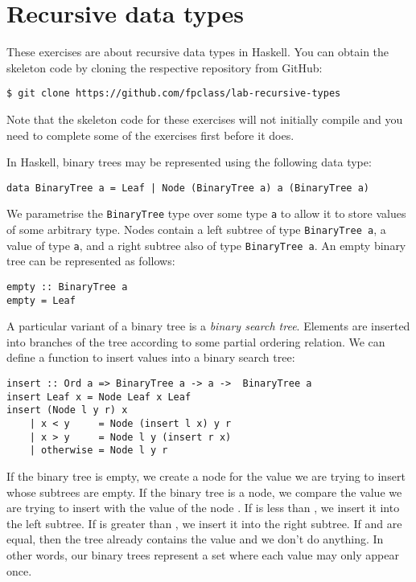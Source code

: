 \section{Recursive data types}

These exercises are about recursive data types in Haskell. You can obtain the skeleton code by cloning the respective repository from GitHub:
\begin{verbatim}
$ git clone https://github.com/fpclass/lab-recursive-types
\end{verbatim}
Note that the skeleton code for these exercises will not initially compile and you need to complete some of the exercises first before it does. 

\taskLine 

In Haskell, binary trees may be represented using the following data type:
\begin{verbatim}
data BinaryTree a = Leaf | Node (BinaryTree a) a (BinaryTree a)
\end{verbatim}
We parametrise the \texttt{\small BinaryTree} type over some type \texttt{\small a} to allow it to store values of some arbitrary type. Nodes contain a left subtree of type \texttt{\small BinaryTree a}, a value of type \texttt{\small a}, and a right subtree also of type \texttt{\small BinaryTree a}. An empty binary tree can be represented as follows:
\begin{verbatim}
empty :: BinaryTree a
empty = Leaf
\end{verbatim}
A particular variant of a binary tree is a \emph{binary search tree}. Elements are inserted into branches of the tree according to some partial ordering relation. We can define a function to insert values into a binary search tree:
\begin{verbatim}
insert :: Ord a => BinaryTree a -> a ->  BinaryTree a
insert Leaf x = Node Leaf x Leaf
insert (Node l y r) x
    | x < y     = Node (insert l x) y r 
    | x > y     = Node l y (insert r x) 
    | otherwise = Node l y r
\end{verbatim}
If the binary tree is empty, we create a node for the value  we are trying to insert whose subtrees are empty. If the binary tree is a node, we compare the value  we are trying to insert with the value of the node . If  is less than , we insert it into the left subtree. If  is greater than , we insert it into the right subtree. If  and  are equal, then the tree already contains the value and we don't do anything. In other words, our binary trees represent a set where each value may only appear once.

